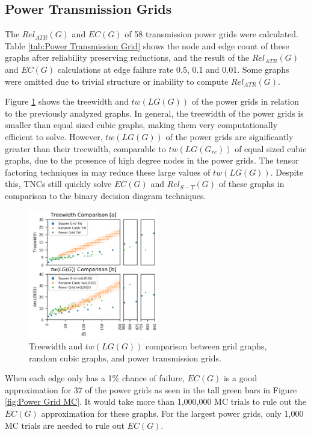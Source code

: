 \hypertarget{power-transmission-grids}{%
\subsection{Power Transmission Grids}\label{power-transmission-grids}}

The \(Rel_{ATR}(G)\) and \(EC(G)\) of 58 transmission power grids \cite{li2016characterizing} were calculated. Table \ref{tab:Power Transmission Grid} shows the node and edge count of these graphs after reliability preserving reductions, and the result of the \(Rel_{ATR}(G)\) and \(EC(G)\) calculations at edge failure rate 0.5, 0.1 and 0.01. Some graphs were omitted due to trivial structure or inability to compute \(Rel_{ATR}(G)\).

Figure \ref{fig:Width Comparison} shows the treewidth and \(tw(LG(G))\) of the power grids in relation to the previously analyzed graphs. In general, the treewidth of the power grids is smaller than equal sized cubic graphs, making them very computationally efficient to solve. However, \(tw(LG(G))\) of the power grids are significantly greater than their treewidth, comparable to \(tw(LG(G_{rc}))\) of equal sized cubic graphs, due to the presence of high degree nodes in the power grids. The tensor factoring techniques in \cite{dudek2019efficient} may reduce these large values of \(tw(LG(G))\). Despite this, TNCs still quickly solve \(EC(G)\) and \(Rel_{S-T}(G)\) of these graphs in comparison to the binary decision diagram techniques.

\begin{figure}[t]
\caption{Treewidth and $tw(LG(G))$ comparison between grid graphs, random cubic graphs, and power transmission grids.}
\label{fig:Width Comparison}
\includegraphics[width=0.5\textwidth]{../figures/WidthCompare.png}
\end{figure}

When each edge only has a 1\% chance of failure, \(EC(G)\) is a good approximation for 37 of the power grids as seen in the tall green bars in Figure \ref{fig:Power Grid MC}. It would take more than 1,000,000 MC trials to rule out the \(EC(G)\) approximation for these graphs. For the largest power grids, only 1,000 MC trials are needed to rule out \(EC(G)\).

